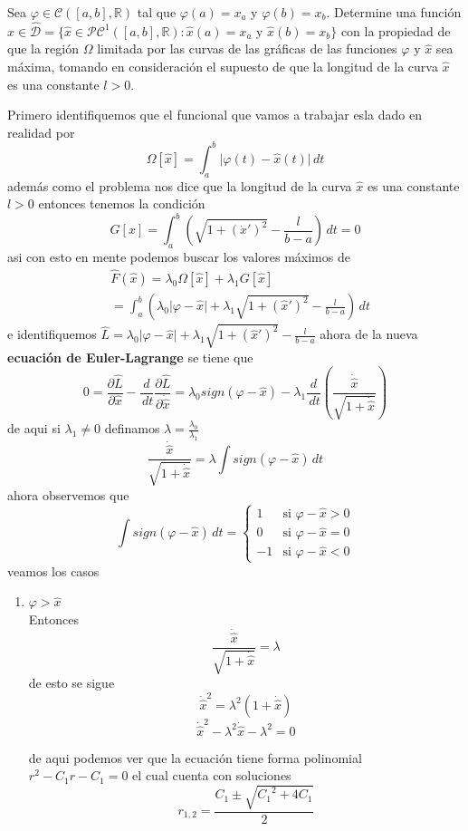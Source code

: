 \documentclass{ejercicios}
\begin{document}
\tableofcontents
\clearpage

\begin{exercise}
  Sea $\varphi\in \mathcal{C}([a,b],\mathbb{R})$ tal que $\varphi(a) = x_a$ y $\varphi(b) = x_b$. Determine una función $\hat{x}\in\hat{\mathcal{D}} = \{\hat{x}\in\mathcal{P}\mathcal{C}^1([a,b],\mathbb{R}):\hat{x}(a) = x_a$ y $\hat{x}(b) = x_b\}$ con la propiedad de que la región $\Omega$ limitada por las curvas de las gráficas de las funciones $\varphi$ y $\hat{x}$ sea máxima, tomando en consideración el supuesto de que la longitud de la curva $\hat{x}$ es una constante $l>0$.

\end{exercise}

\begin{solution}
  Primero identifiquemos que el funcional que vamos a trabajar esla dado en realidad por 
  \[\Omega[\hat{x}] = \int_{a}^{b}\rvert\varphi(t) - \hat{x}(t)\lvert\,dt\]
  además como el problema nos dice que la longitud de la curva $\hat{x}$ es una constante $l>0$ entonces tenemos la condición 
  \[G[x] = \int_{a}^{b}\left(\sqrt{1 + (\dot{x}')^2} - \frac{l}{b-a}\right)\,dt = 0\]
  asi con esto en mente podemos buscar los valores máximos de 
  \[
  \begin{aligned}
    & \hat{F}(\hat{x}) = \lambda_0\Omega[{\hat{x}}] + \lambda_1 G[\hat{x}]\\ 
    & = \int_{a}^{b}\left(\lambda_0\lvert\varphi - \hat{x}\rvert + \lambda_1\sqrt{1 + (\hat{x}')^2} - \frac{l}{b-a}\right)\,dt
  \end{aligned}
  \]
  e identifiquemos $\hat{L} = \lambda_0\lvert\varphi - \hat{x}\rvert + \lambda_1\sqrt{1 + (\hat{x}')^2} - \frac{l}{b-a}$ ahora de la nueva \textbf{ecuación de Euler-Lagrange} se tiene que 
  \[
    0 = \frac{\partial\hat{L}}{\partial{\hat{x}}}-\frac{d}{\,dt}\frac{\partial\hat{L}}{\partial{\dot{\hat{x}}}} =  \lambda_0sign(\varphi - \hat{x}) - \lambda_1\frac{d}{\,dt}\left(\frac{\dot{\hat{x}}}{\sqrt{1 + \dot{\hat{x}}}}\right)
  \]
  de aqui si $\lambda_1 \neq 0$ definamos $\lambda = \frac{\lambda_0}{\lambda_1}$
\[\frac{\dot{\hat{x}}}{\sqrt{1 + \dot{\hat{x}}}} = \lambda\int sign(\varphi - \hat{x})\,dt\]
  ahora observemos que 
  \[
    \int sign(\varphi - \hat{x})\,dt = 
  \begin{cases}
    1 & \text{si } \varphi - \hat{x} > 0 \\ 
    0 & \text{si } \varphi - \hat{x} = 0 \\ 
    -1 & \text{si } \varphi - \hat{x} < 0
  \end{cases}
  \]
  veamos los casos 
  \begin{enumerate}
    \item $\varphi > \hat{x}$ \\ Entonces \[\frac{\dot{\hat{x}}}{\sqrt{1 + \dot{\hat{x}}}} = \lambda\] de esto se sigue 
      \[\dot{\hat{x}}^2 = \lambda^2(1 + \dot{\hat{x}})\]
      \[\dot{\hat{x}}^2 - \lambda^2\dot{\hat{x}} - \lambda^2 = 0\]

      de aqui podemos ver que la ecuación tiene forma polinomial $r^2 - C_1 r - C_1 = 0$ el cual cuenta con soluciones 
    \[ r_{1,2} = \frac{C_1 \pm \sqrt{{C_1}^2 + 4C_1}}{2}\]
  \end{enumerate}
\end{solution}
\end{document}
